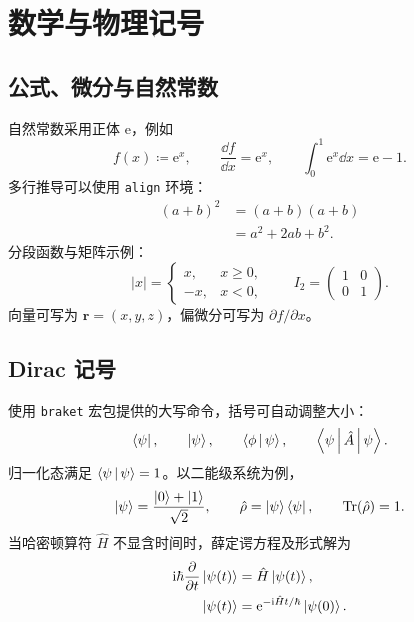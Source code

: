 \chapter{数学与物理记号}
\label{chap:physics}

\section{公式、微分与自然常数}
自然常数采用正体 $\mathrm{e}$，例如
\begin{equation}
  \label{eq:exponential}
  f(x)\coloneqq \mathrm{e}^{x},\qquad
  \frac{\dd f}{\dd x}=\mathrm{e}^{x},\qquad
  \int_0^1 \mathrm{e}^{x}\dd x=\mathrm{e}-1.
\end{equation}
多行推导可以使用 \texttt{align} 环境：
\begin{align}
  (a+b)^2 &= (a+b)(a+b)\\
          &= a^2+2ab+b^2.
\end{align}
分段函数与矩阵示例：
\[
  |x|=\begin{cases}
    x, & x\geq 0,\\
    -x, & x<0,
  \end{cases}
  \qquad
  I_2=\begin{pmatrix}1&0\\0&1\end{pmatrix}.
\]
向量可写为 $\bm{r}=(x,y,z)$，偏微分可写为
$\partial f/\partial x$。

\section{Dirac 记号}
使用 \texttt{braket} 宏包提供的大写命令，括号可自动调整大小：
\[
  \Bra{\psi},\qquad
  \Ket{\psi},\qquad
  \Braket{\phi|\psi},\qquad
  \Braket{\psi|\hat{A}|\psi}.
\]
归一化态满足 $\Braket{\psi|\psi}=1$。以二能级系统为例，
\begin{equation}
  \Ket{\psi}=\frac{\Ket{0}+\Ket{1}}{\sqrt{2}},\qquad
  \hat{\rho}=\Ket{\psi}\Bra{\psi},\qquad
  \operatorname{Tr}(\hat{\rho})=1.
\end{equation}
当哈密顿算符 $\hat{H}$ 不显含时间时，薛定谔方程及形式解为
\begin{align}
  \mathrm{i}\hbar\frac{\partial}{\partial t}\Ket{\psi(t)}
    &=\hat{H}\Ket{\psi(t)},\\
  \Ket{\psi(t)}
    &=\mathrm{e}^{-\mathrm{i}\hat{H}t/\hbar}\Ket{\psi(0)}.
\end{align}

